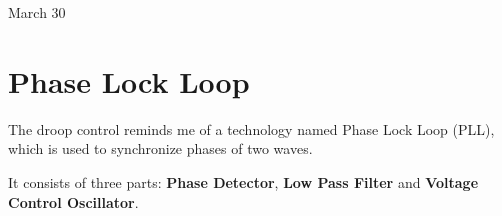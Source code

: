 \univlogo

{\Huge March 30}\vspace{5mm}

\section*{Phase Lock Loop}

The droop control reminds me of a technology named Phase Lock Loop (PLL), which is used to synchronize phases of two waves.

It consists of three parts: \textbf{Phase Detector}, \textbf{Low Pass Filter} and \textbf{Voltage Control Oscillator}.



\subsection*{}